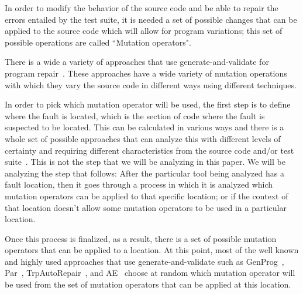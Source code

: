 \documentclass[conference]{IEEEtran}
\newcommand{\todo}[1]
  {{\scriptsize \textbf{\color{red} {#1}}}}
\begin{document}
In order to modify the behavior of the source code and be able to repair the 
errors entailed by the test suite, it is needed a set of possible changes that 
can be applied to the source code which will allow for program variations; this 
set of possible operations are called ``Mutation operators". 

There is a wide a variety of approaches that use generate-and-validate for 
program repair~\cite{legoues12,kim2013,Weimer13,fan15,long15,debroy10,perkins09,wei10}. These approaches 
have a wide variety of mutation operations with which they vary the source code 
in different ways using different techniques. 

In
order to pick which mutation operator will be used, the 
first step is to define where the fault is located, which is the section of code 
where the
fault is suspected to be located. This can be calculated in various ways and 
there is 
a whole set of
possible approaches that can analyze this with different levels of certainty and 
requiring different characteristics from the source code and/or test 
suite~\cite{Jones05,Jones02,Chen02,legoues12,Qi13,Qi2013}. This is not the 
step that we will be analyzing in this
paper. We will be analyzing the step that follows: After the particular tool 
being analyzed has a fault location, then
it goes through a process in which it is analyzed which mutation operators can
be applied to that specific location; or if the context of that location doesn't
allow some mutation operators to be used in a particular location. 

Once this process is finalized, as a result, there is a set of possible 
mutation operators that
can be applied to a location. At this point, most of the well known and highly 
used approaches that use generate-and-validate such as GenProg~\cite{legoues12}, 
Par~\cite{kim2013}, TrpAutoRepair~\cite{QiYuhua13}, and AE~\cite{Weimer13} choose 
at random which mutation operator will be used from the set of mutation 
operators that can be applied at this location. 

\end{document}
